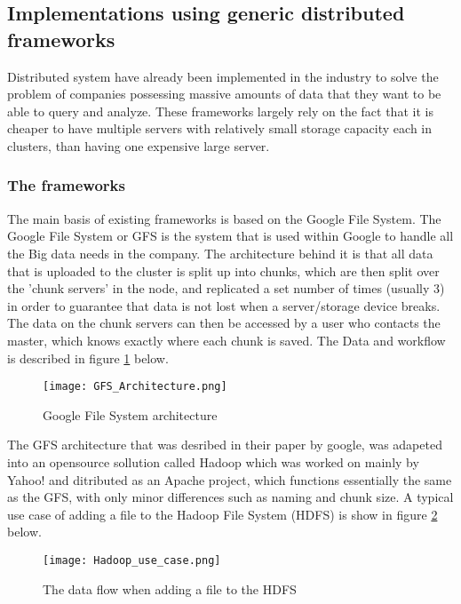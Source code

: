 \subsection{Implementations using generic distributed frameworks}
Distributed system have already been implemented in the industry to solve the
problem of companies possessing massive amounts of data that they want to be able
to query and analyze. These frameworks largely rely on the fact that it is cheaper
to have multiple servers with relatively small storage capacity each in clusters,
than having one expensive large server.

\subsubsection{The frameworks}
The main basis of existing frameworks is based on the Google File System\cite{Ghem03}. The
Google File System or GFS is the system that is used within Google to handle all
the Big data needs in the company. The architecture behind it is that all data that
is uploaded to the cluster is split up into chunks, which are then split over the
'chunk servers' in the node, and replicated a set number of times (usually 3) in
order to guarantee that data is not lost when a server/storage device breaks. The
data on the chunk servers can then be accessed by a user who contacts the master,
which knows exactly where each chunk is saved.\cite{Ghem03} The Data and workflow is described
in figure \ref{GFS_Architecture} below.

\begin{figure}
  \texttt{[image: GFS\_Architecture.png]}
  \caption{Google File System architecture\cite{Ghem03}}
  \label{GFS_Architecture}
\end{figure}

The GFS architecture that was desribed in their paper by google, was adapeted into
an opensource sollution called Hadoop \cite{Shv10} which was worked on mainly by Yahoo! and
ditributed as an Apache project, which functions essentially the same as the GFS,
with only minor differences such as naming and chunk size. A typical use case of
adding a file to the Hadoop File System (HDFS) is show in figure \ref{Hadoop_usecase}
below.

\begin{figure}
  \texttt{[image: Hadoop\_use\_case.png]}
  \caption{The data flow when adding a file to the HDFS\cite{Shv10}}
  \label{Hadoop_usecase}
\end{figure}

